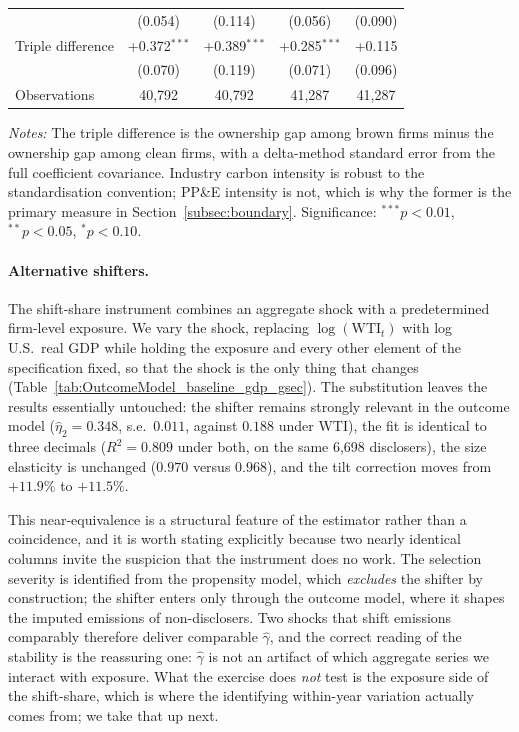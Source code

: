 \documentclass[a4paper,12pt]{article}
\begin{document}
\begin{table}[htbp]
\begin{tabular}{lcccc}
 & (0.054) & (0.114) & (0.056) & (0.090) \\
Triple difference & +0.372$^{***}$ & +0.389$^{***}$ & +0.285$^{***}$ & +0.115 \\
 & (0.070) & (0.119) & (0.071) & (0.096) \\
\midrule
Observations & 40,792 & 40,792 & 41,287 & 41,287 \\
\bottomrule
\end{tabular}
\begin{flushleft}\footnotesize
\textit{Notes:} The triple difference is the ownership gap among brown firms minus the ownership
gap among clean firms, with a delta-method standard error from the full coefficient covariance.
Industry carbon intensity is robust to the standardisation convention; PP\&E intensity is not,
which is why the former is the primary measure in Section~\ref{subsec:boundary}.
Significance: $^{***}p<0.01$, $^{**}p<0.05$, $^{*}p<0.10$.
\end{flushleft}
\end{table}

\paragraph{Alternative shifters.} The shift-share instrument combines an aggregate shock with a predetermined firm-level exposure. We vary the shock, replacing $\log(\mathrm{WTI}_t)$ with log U.S.\ real GDP while holding the exposure and every other element of the specification fixed, so that the shock is the only thing that changes (Table~\ref{tab:OutcomeModel_baseline_gdp_gsec}). The substitution leaves the results essentially untouched: the shifter remains strongly relevant in the outcome model ($\hat\eta_2 = 0.348$, s.e.\ $0.011$, against $0.188$ under WTI), the fit is identical to three decimals ($R^2 = 0.809$ under both, on the same 6{,}698 disclosers), the size elasticity is unchanged ($0.970$ versus $0.968$), and the tilt correction moves from $+11.9\%$ to $+11.5\%$.

This near-equivalence is a structural feature of the estimator rather than a coincidence, and it is worth stating explicitly because two nearly identical columns invite the suspicion that the instrument does no work. The selection severity is identified from the propensity model, which \emph{excludes} the shifter by construction; the shifter enters only through the outcome model, where it shapes the imputed emissions of non-disclosers. Two shocks that shift emissions comparably therefore deliver comparable $\hat\gamma$, and the correct reading of the stability is the reassuring one: $\hat\gamma$ is not an artifact of which aggregate series we interact with exposure. What the exercise does \emph{not} test is the exposure side of the shift-share, which is where the identifying within-year variation actually comes from; we take that up next.
\end{document}
